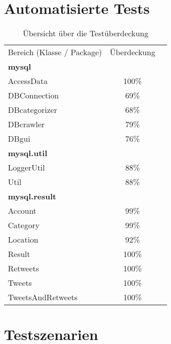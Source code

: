 \section{Automatisierte Tests}

\begin{table}[h]
\begin{tabular} {lcr}
Bereich (Klasse / Package) & Überdeckung \\
	\textbf{mysql} &  \\
		\hspace*{3mm}AccessData & 100\% \\
		\hspace*{3mm}DBConnection & 69\% \\
		\hspace*{3mm}DBcategorizer & 68\% \\
		\hspace*{3mm}DBcrawler & 79\% \\
		\hspace*{3mm}DBgui & 76\% \\
	\textbf{mysql.util} &  \\
		\hspace*{3mm}LoggerUtil & 88\% \\
		\hspace*{3mm}Util & 88\% \\
	\textbf{mysql.result} &  \\
		\hspace*{3mm}Account & 99\% \\
		\hspace*{3mm}Category & 99\% \\
		\hspace*{3mm}Location & 92\% \\
		\hspace*{3mm}Result & 100\% \\
		\hspace*{3mm}Retweets & 100\% \\
		\hspace*{3mm}Tweets & 100\% \\
		\hspace*{3mm}TweetsAndRetweets & 100\% \\
	\end{tabular}
	\caption{Übersicht über die Testüberdeckung}
\end{table}

\section{Testszenarien}

